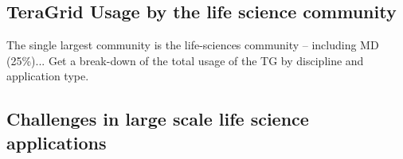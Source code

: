 \documentclass[12pt]{article}
\begin{document}
%
%
%
%
%
%
%

\subsection{TeraGrid Usage by the life science community}

The single largest community is the life-sciences community --
including MD (25\%)...
Get a break-down of the total usage of the TG by discipline and
application type.

\subsection{Challenges in large scale life science applications}
\end{document}
